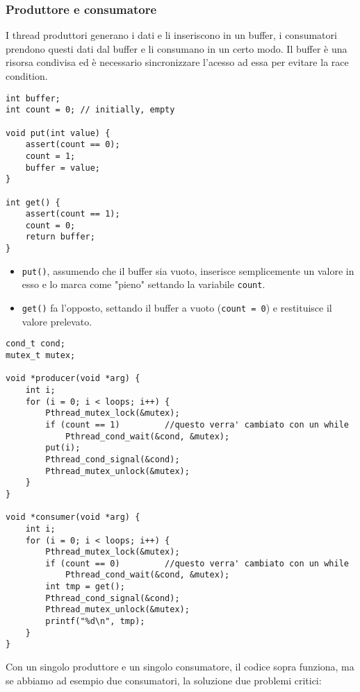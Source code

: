 \documentclass[12pt, letterpaper]{article}
\begin{document}
			\subsubsection{Produttore e consumatore}
				I thread produttori generano i dati e li inseriscono in un buffer, i consumatori prendono questi dati dal buffer e li consumano in un certo modo. Il buffer è una risorsa condivisa ed è necessario sincronizzare l'acesso ad essa per evitare la race condition.
				\begin{lstlisting}[style=CStyle]
int buffer;
int count = 0; // initially, empty

void put(int value) {
	assert(count == 0);
	count = 1;
	buffer = value;
}

int get() {
	assert(count == 1);
	count = 0;
	return buffer;
}				\end{lstlisting}
				\begin{itemize}
				\item \texttt{put()}, assumendo che il buffer sia vuoto, inserisce semplicemente un valore in esso e lo marca come "pieno" settando la variabile \texttt{count}. 
				\item \texttt{get()} fa l'opposto, settando il buffer a vuoto (\texttt{count = 0}) e restituisce il valore prelevato.
				\end{itemize}
				\begin{lstlisting}[style=CStyle]
cond_t cond;
mutex_t mutex;

void *producer(void *arg) {
	int i;
	for (i = 0; i < loops; i++) {
		Pthread_mutex_lock(&mutex);
		if (count == 1)			//questo verra' cambiato con un while
			Pthread_cond_wait(&cond, &mutex);
		put(i);
		Pthread_cond_signal(&cond);
		Pthread_mutex_unlock(&mutex);
	}
}

void *consumer(void *arg) {
	int i;
	for (i = 0; i < loops; i++) {
		Pthread_mutex_lock(&mutex);
		if (count == 0)			//questo verra' cambiato con un while
			Pthread_cond_wait(&cond, &mutex);
		int tmp = get();
		Pthread_cond_signal(&cond);
		Pthread_mutex_unlock(&mutex);
		printf("%d\n", tmp);
	}
}				\end{lstlisting}
				Con un singolo produttore e un singolo consumatore, il codice sopra funziona, ma se abbiamo ad esempio due consumatori, la soluzione due problemi critici:
\end{document}
